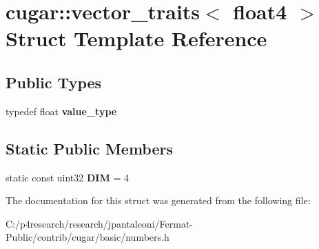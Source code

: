 \hypertarget{structcugar_1_1vector__traits_3_01float4_01_4}{}\section{cugar\+:\+:vector\+\_\+traits$<$ float4 $>$ Struct Template Reference}
\label{structcugar_1_1vector__traits_3_01float4_01_4}
\subsection*{Public Types}
\begin{DoxyCompactItemize}
\item 
\mbox{\label{structcugar_1_1vector__traits_3_01float4_01_4_a623c2b1554266954adece5cf3c090cb7}} 
typedef float {\bfseries value\+\_\+type}
\end{DoxyCompactItemize}
\subsection*{Static Public Members}
\begin{DoxyCompactItemize}
\item 
\mbox{\label{structcugar_1_1vector__traits_3_01float4_01_4_a75ee36ca11c5de8ffadaed79abc31c7b}} 
static const uint32 {\bfseries D\+IM} = 4
\end{DoxyCompactItemize}


The documentation for this struct was generated from the following file\+:\begin{DoxyCompactItemize}
\item 
C\+:/p4research/research/jpantaleoni/\+Fermat-\/\+Public/contrib/cugar/basic/numbers.\+h\end{DoxyCompactItemize}
